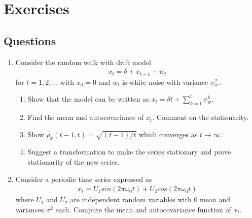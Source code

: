 \documentclass[../../time_series_notes.tex]{subfiles}
\begin{document}
\section{Exercises}
\subsection{Questions}
\begin{enumerate}
    \item Consider the random walk with drift model
    \begin{align*}
        x_{t} = \delta + x_{t-1} + w_{t}
    \end{align*}
    for $t = 1,2,\ldots$ with $x_{0} = 0$ and $w_{t}$ is white noise with variance $\sigma_{w}^{2}$.
    \begin{enumerate}
        \item Show that the model can be written as $x_{t} = \delta t + \sum_{k=1}^{t}\sigma_{w}^{k}$.
        \item Find the mean and autocovariance of $x_{t}$. Comment on the stationarity.
        \item Show $\rho_{x}(t-1,t) = \sqrt{(t-1)/t}$ which converges as $t\rightarrow \infty$.
        \item Suggest a transformation to make the series stationary and prove stationarity of the new series.
    \end{enumerate}

    \item Consider a periodic time series expressed as
    \begin{align*}
        x_{t} = U_{1}sin(2\pi \omega_{0}t) + U_{2}cos(2\pi \omega_{0}t)
    \end{align*}
    where $U_{1}$ and $U_{2}$ are independent random variables with $0$ mean and variances $\sigma^{2}$ each. Compute the mean and autocovariance function of $x_{t}$.
\end{enumerate}
\end{document}
